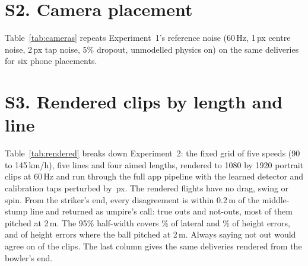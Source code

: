 \documentclass[journal]{IEEEtran}
\begin{document}
\begin{table}[t]
\centering
\caption{Frame timing. Accuracy, one-sigma coverage of the fit's own covariance, verdict agreement and
umpire's-call share on \FpsN{} simulated deliveries, by capture rate and by how frames are timed.
Errors in mm.}
\label{tab:fps}
\scriptsize

\end{table}

\section*{S2. Camera placement}

Table~\ref{tab:cameras} repeats Experiment~1's reference noise (60\,Hz, 1\,px centre noise, 2\,px tap noise,
5\% dropout, unmodelled physics on) on the same \GeoPerCell{} deliveries for six phone placements.

\begin{table}[t]
\centering
\caption{Camera placement. Anchored estimator on the same \GeoPerCell{} simulated deliveries for each
placement, reference noise. False out: not-out deliveries returned as out. Errors in mm at the stump plane.}
\label{tab:cameras}
\scriptsize

\end{table}

\section*{S3. Rendered clips by length and line}

Table~\ref{tab:rendered} breaks down Experiment~2: the fixed grid of five speeds (90 to 145\,km/h), five lines
and four aimed lengths, rendered to 1080 by 1920 portrait clips at 60\,Hz and run through the full app
pipeline with the learned detector and calibration taps perturbed by \EteTapPx\,px. The rendered flights have
no drag, swing or spin. From the striker's end, every disagreement is within 0.2\,m of the middle-stump line and returned as umpire's call:
\EteOutToUmp{} true outs and \EteNotOutToUmp{} not-outs, most of them pitched at 2\,m. The 95\% half-width
covers \EteCoverNinetyfiveY\% of lateral and \EteCoverNinetyfiveZ\% of height errors, and
\EteCoverZLenTwo{} of \EteCoverZLenTwoN{} height errors where the ball pitched at 2\,m. Always saying not out
would agree on \EteNotOutTruth{} of the \EteN{} clips. The last column gives the same deliveries rendered from the bowler's end.

\begin{table}[t]
\centering
\caption{Experiment~2 by aimed length and line, \EteN{} rendered clips through the full pipeline. Umpire's
call: count returned as umpire's call. Errors in mm at the stump plane.}
\label{tab:rendered}
\scriptsize
\setlength{\tabcolsep}{1.5pt}

\end{table}
\end{document}

